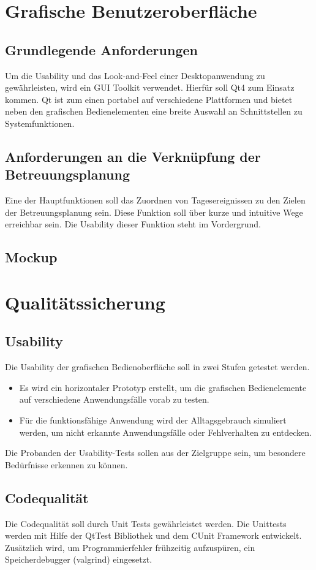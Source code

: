 \documentclass[a4paper,10pt]{article}
\begin{document}
\section{Grafische Benutzeroberfläche}
\subsection{Grundlegende Anforderungen}
Um die Usability und das Look-and-Feel einer Desktopanwendung zu gewährleisten, wird ein GUI Toolkit verwendet.
Hierfür soll Qt4 zum Einsatz kommen. Qt ist zum einen portabel auf verschiedene Plattformen 
und bietet neben den grafischen Bedienelementen eine breite Auswahl an Schnittstellen zu Systemfunktionen.
\subsection{Anforderungen an die Verknüpfung der Betreuungsplanung}
Eine der Hauptfunktionen soll das Zuordnen von Tagesereignissen zu den Zielen der Betreuungsplanung sein. Diese Funktion soll über 
kurze und intuitive Wege erreichbar sein. Die Usability dieser Funktion steht im Vordergrund.
\subsection{Mockup}

\section{Qualitätssicherung}
\subsection{Usability}
Die Usability der grafischen Bedienoberfläche soll in zwei Stufen getestet werden.
\begin{itemize}
	\item Es wird ein horizontaler Prototyp erstellt,  um die grafischen Bedienelemente auf verschiedene Anwendungsfälle vorab zu testen. 
	\item Für die funktionsfähige Anwendung wird der Alltagsgebrauch simuliert werden, um nicht erkannte Anwendungsfälle oder Fehlverhalten zu entdecken.
\end{itemize}
Die Probanden der Usability-Tests sollen aus der Zielgruppe sein, um besondere Bedürfnisse erkennen zu können.    
\subsection{Codequalität}
Die Codequalität soll durch Unit Tests gewährleistet werden.
Die Unittests werden mit Hilfe der QtTest Bibliothek und dem CUnit Framework entwickelt.
Zusätzlich wird, um Programmierfehler frühzeitig aufzuspüren, ein Speicherdebugger (valgrind) eingesetzt.
\end{document}
